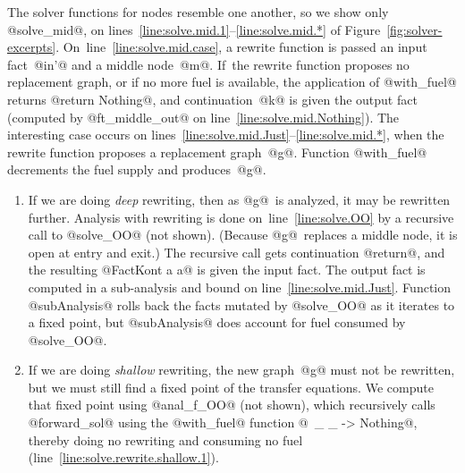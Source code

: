 \documentclass[blockstyle,preprint,natbib,nocopyrightspace]{sigplanconf}
\newcommand\lineref[1]{line~\ref{line:#1}}
\newcommand\linerangeref[2]{\mbox{lines~\ref{line:#1}--\ref{line:#2}}}
\def\authornote#1{\unskip\relax}
\newcommand{\simon}[1]{\authornote{SLPJ: #1}}
\newcommand\figref[1]{Figure~\ref{fig:#1}}
\begin{document}
The solver functions for nodes
resemble one another, so we show only
@solve_mid@, on
\linerangeref{solve.mid.1}{solve.mid.*} of \figref{solver-excerpts}.
On~\lineref{solve.mid.case}, a rewrite function is passed an
input fact~@in'@ and a middle node~@m@.
If~the rewrite function proposes no replacement graph, 
or if no more fuel is available, the application of @with_fuel@
returns @return Nothing@, and continuation~@k@ is given the output fact
(computed by @ft_middle_out@ on \lineref{solve.mid.Nothing}).
%
The interesting case occurs on \linerangeref{solve.mid.Just}{solve.mid.*},
when the rewrite function 
proposes a replacement graph~@g@.
Function @with_fuel@ decrements the fuel supply and produces~@g@.
\begin{enumerate}
\item
If we are doing \emph{deep} rewriting, then as @g@~is analyzed,
it may be rewritten further.
Analysis with rewriting is done
on~\lineref{solve.OO}
by a recursive call to @solve_OO@ (not shown).
(Because @g@~replaces a middle node, it is open at entry and exit.)
The recursive call gets continuation @return@, and the
resulting @FactKont a a@ is given
the input fact.
The output fact is computed in a sub-analysis
and bound on
\lineref{solve.mid.Just}. 
%
Function @subAnalysis@ rolls back the facts mutated
by @solve_OO@ as it iterates to a fixed point, but @subAnalysis@
does account for 
fuel consumed by @solve_OO@.
\item
If we are doing \emph{shallow} rewriting,  the new graph~@g@ must not be
rewritten, but we must still find a fixed point of the transfer
equations.
We compute that fixed point using @anal_f_OO@ (not shown), which  recursively calls
@forward_sol@ using the @with_fuel@ function
@\ _ _ -> Nothing@, 
thereby doing no rewriting and consuming no fuel
(\lineref{solve.rewrite.shallow.1}).
\simon{This business of passing in a different @with\_fuel@ seems terribly
clumsy to me.  The obvious thing would be to add a third constructor \texttt{NoRewrite}
to the @RewritingDepth@ type, so that we could call @forward\_sol@ saying
``don't do any rewriting at all''.  Would that even elimiate the higher order
@with\_fuel@ parameter altogether?  What is it used for? 
NR:~If you re-examine the structure of the case expressions, you'll
see that \texttt{NoRewrite} as a third constructor would leave to
inexhaustive pattern matching.  A Boolean would do.
Function @with\_fuel@ is also
used to decrement the fuel supply.
Combining the decrement with the test in a higher-order function
simplified the code significantly (and made it impossible to forget to
decrement).
}
%
\end{enumerate}
\end{document}
